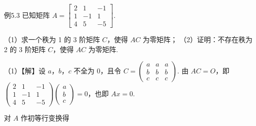 \begin{fcard}{例5.3}
已知矩阵 $A=\begin{bmatrix}2&1&-1\\1&-1&1\\4&5&-5\end{bmatrix}$.

（1）求一个秩为 1 的 3 阶矩阵 $C$，使得 $AC$ 为零矩阵；
（2）证明：不存在秩为 2 的 3 阶矩阵 $C$，使得 $AC$ 为零矩阵.

（1）【解】设 $a$，$b$，$c$ 不全为 0，且令 $C=\begin{pmatrix}a&a&a\\b&b&b\\c&c&c\end{pmatrix}$. 由 $AC=O$，即 $\begin{pmatrix}2&1&-1\\1&-1&1\\4&5&-5\end{pmatrix}\begin{pmatrix}a\\b\\c\end{pmatrix}=0$，也即 $Ax=0$.

对 $A$ 作初等行变换得



\end{fcard}
